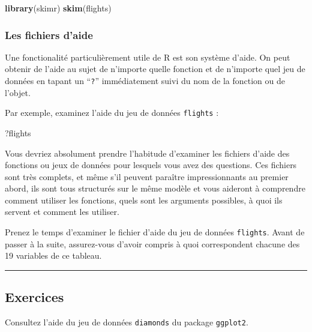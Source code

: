 \documentclass[
  a4paper,
]{article}
\newenvironment{Shaded}{\begin{snugshade}}{\end{snugshade}}
\newcommand{\KeywordTok}[1]{\textcolor[rgb]{0.12,0.11,0.11}{\textbf{#1}}}
\newcommand{\NormalTok}[1]{\textcolor[rgb]{0.12,0.11,0.11}{#1}}
\begin{document}
\begin{Shaded}
\begin{Highlighting}[]
\KeywordTok{library}\NormalTok{(skimr)}
\KeywordTok{skim}\NormalTok{(flights)}
\end{Highlighting}
\end{Shaded}

\hypertarget{les-fichiers-daide}{%
\subsubsection{Les fichiers d'aide}\label{les-fichiers-daide}}

Une fonctionalité particulièrement utile de R est son système d'aide. On peut obtenir de l'aide au sujet de n'importe quelle fonction et de n'importe quel jeu de données en tapant un ``\texttt{?}'' immédiatement suivi du nom de la fonction ou de l'objet.

Par exemple, examinez l'aide du jeu de données \texttt{flights} :

\begin{Shaded}
\begin{Highlighting}[]
\NormalTok{?flights}
\end{Highlighting}
\end{Shaded}

Vous devriez absolument prendre l'habitude d'examiner les fichiers d'aide des fonctions ou jeux de données pour lesquels vous avez des questions. Ces fichiers sont très complets, et même s'il peuvent paraître impressionnants au premier abord, ils sont tous structurés sur le même modèle et vous aideront à comprendre comment utiliser les fonctions, quels sont les arguments possibles, à quoi ils servent et comment les utiliser.

Prenez le temps d'examiner le fichier d'aide du jeu de données \texttt{flights}. Avant de passer à la suite, assurez-vous d'avoir compris à quoi correspondent chacune des 19 variables de ce tableau.

\begin{center}\rule{0.5\linewidth}{0.5pt}\end{center}

\hypertarget{Exo-2}{%
\subsection{Exercices}\label{Exo-2}}

Consultez l'aide du jeu de données \texttt{diamonds} du package \texttt{ggplot2}.
\end{document}
